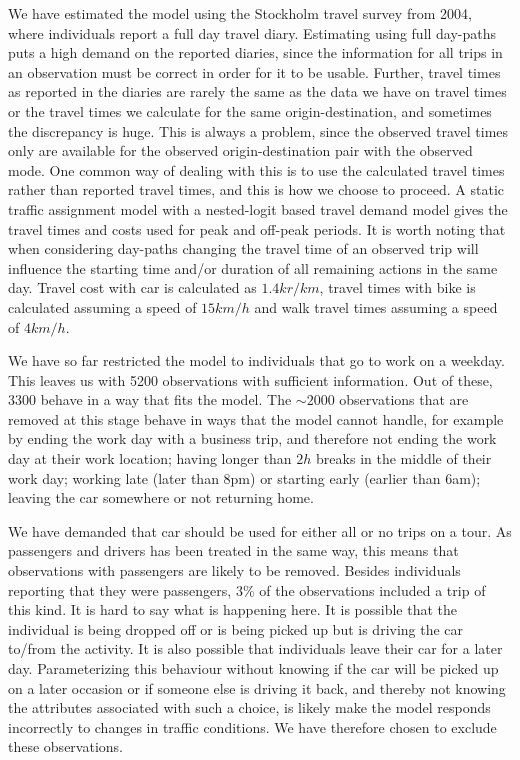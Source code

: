 
We have estimated the model using the Stockholm travel survey from 2004, where individuals report a full day travel diary. Estimating using full day-paths puts a high demand on the reported diaries, since the information for all trips in an observation must be correct in order for it to be usable. Further, travel times as reported in the diaries are rarely the same as the data we have on travel times or the travel times we calculate for the same origin-destination, and sometimes the discrepancy is huge. This is always a problem, since the observed travel times only are available for the observed origin-destination pair with the observed mode. One common way of dealing with this is to use the calculated travel times rather than reported travel times, and this is how we choose to proceed. A static traffic assignment model with a nested-logit based travel demand model gives the travel times and costs used for peak and off-peak periods. It is worth noting that when considering day-paths changing the travel time of an observed trip will influence the starting time and/or duration of all remaining actions in the same day. Travel cost with car is calculated as $1.4\unit{kr/km}$, travel times with bike is calculated assuming a speed of $15\unit{km/h}$ and walk travel times assuming a speed of $4\unit{km/h}$.

We have so far restricted the model to individuals that go to work on a weekday. This leaves us with 5200 observations with sufficient information. Out of these, 3300 behave in a way that fits the model. The $\sim 2000$ observations that are removed at this stage behave in ways that the model cannot handle, for example by ending the work day with a business trip, and therefore not ending the work day at their work location; having longer than $2h$ breaks in the middle of their work day; working late (later than 8pm) or starting early (earlier than 6am); leaving the car somewhere or not returning home.

We have demanded that car should be used for either all or no trips on a tour. As passengers and drivers has been treated in the same way, this means that observations with passengers are likely to be removed. Besides individuals reporting that they were passengers, $3\%$ of the observations included a trip of this kind. It is hard to say what is happening here. It is possible that the individual is being dropped off or is being picked up but is driving the car to/from the activity. It is also possible that individuals leave their car for a later day. Parameterizing this behaviour without knowing if the car will be picked up on a later occasion or if someone else is driving it back, and thereby not knowing the attributes associated with such a choice, is likely make the model responds incorrectly to changes in traffic conditions. We have therefore chosen to exclude these observations.







